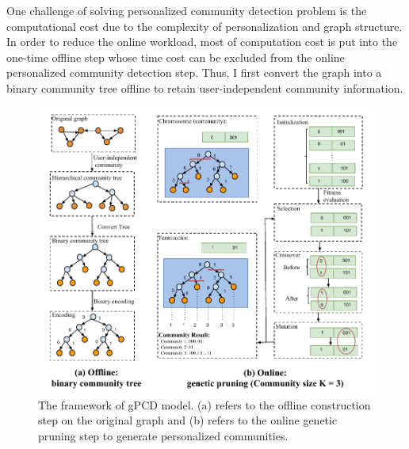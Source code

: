 One challenge of solving personalized community detection problem is the computational cost due to the complexity of personalization and graph structure. In order to reduce the online workload, most of computation cost is put into the one-time offline step whose time cost can be excluded from the online personalized community detection step. Thus, I first convert the graph into a binary community tree offline to retain user-independent community information. 
\begin{figure}  
	  \center
	\includegraphics[width=1.0\columnwidth]{img/chapter3/4.pdf}
	\caption{The framework of gPCD model. (a) refers to the offline construction step on the original graph and (b) refers to the online genetic pruning step to generate personalized communities.} 
	\label{fig:pipeline}
\end{figure}
